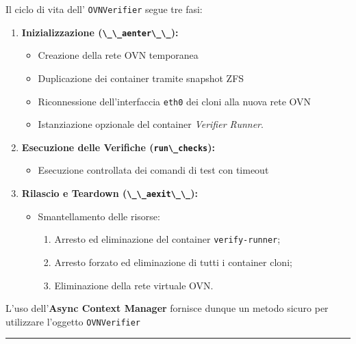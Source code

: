 Il ciclo di vita dell' \passthrough{\lstinline!OVNVerifier!} segue tre
fasi:

\begin{enumerate}
\def\labelenumi{\arabic{enumi}.}
\tightlist
\item
  \textbf{Inizializzazione (\passthrough{\lstinline!\_\_aenter\_\_!}):}

  \begin{itemize}
  \tightlist
  \item
    Creazione della rete OVN temporanea
  \item
    Duplicazione dei container tramite snapshot ZFS
  \item
    Riconnessione dell'interfaccia \passthrough{\lstinline!eth0!} dei
    cloni alla nuova rete OVN
  \item
    Istanziazione opzionale del container \emph{Verifier Runner}.
  \end{itemize}
\item
  \textbf{Esecuzione delle Verifiche
  (\passthrough{\lstinline!run\_checks!}):}

  \begin{itemize}
  \tightlist
  \item
    Esecuzione controllata dei comandi di test con timeout
  \end{itemize}
\item
  \textbf{Rilascio e Teardown
  (\passthrough{\lstinline!\_\_aexit\_\_!}):}

  \begin{itemize}
  \tightlist
  \item
    Smantellamento delle risorse:

    \begin{enumerate}
    \def\labelenumii{\arabic{enumii}.}
    \tightlist
    \item
      Arresto ed eliminazione del container
      \passthrough{\lstinline!verify-runner!};
    \item
      Arresto forzato ed eliminazione di tutti i container cloni;
    \item
      Eliminazione della rete virtuale OVN.
    \end{enumerate}
  \end{itemize}
\end{enumerate}

L'uso dell'\textbf{Async Context Manager} fornisce dunque un metodo
sicuro per utilizzare l'oggetto \passthrough{\lstinline!OVNVerifier!}

\begin{center}\rule{0.5\linewidth}{0.5pt}\end{center}

